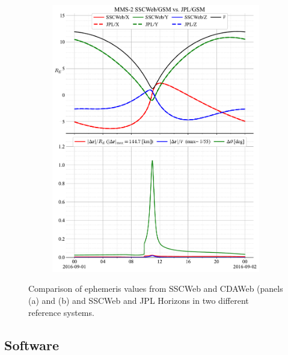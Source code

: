 \documentclass[draft]{agujournal2019}
\begin{document}
\begin{figure}[h]
\begin{subfigure}[b]{0.49\textwidth}
         \includegraphics[width=\textwidth]{code/figures/ephemeris/MMS-2_SSCWeb-GSM_vs_JPL-GSM.pdf}
     \end{subfigure}
     \caption{Comparison of ephemeris values from SSCWeb and CDAWeb (panels (a) and (b) and SSCWeb and JPL Horizons in two different reference systems.}
     \label{fig:mms-2}
\end{figure}

\clearpage




\subsection{Software}
\label{sect:comparisons_software}
\end{document}
